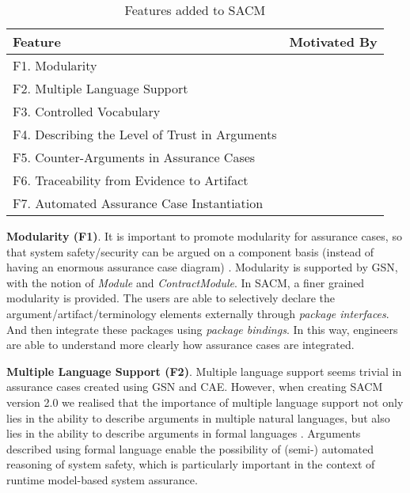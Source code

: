 \begin{table}
	\centering
	\vspace{-1em}
	\begin{tabular}{|l|l|}
		\hline
		\textbf{Feature}               & \multicolumn{1}{c|}{\textbf{Motivated By}}                        \\ \hline
		F1. Modularity            & \multicolumn{1}{c|}{\cite{despotou2008investigating}} \\ \hline
		F2. Multiple Language Support &\multicolumn{1}{c|}{\cite{denney2013formal}}                  \\ \hline
		F3. Controlled Vocabulary &\multicolumn{1}{c|}{\cite{luo2015safety, attwood2014use}}                  \\ \hline
		F4. Describing the Level of Trust in Arguments &\multicolumn{1}{c|}{\cite{hawkins2011new, fenn2005putting}}                  \\ \hline
		F5. Counter-Arguments in Assurance Cases &\multicolumn{1}{c|}{\cite{armstrong2004deconstruction}}                  \\ \hline
		F6. Traceability from Evidence to Artifact &\multicolumn{1}{c|}{\cite{taguchi2014linking}}                  \\ \hline
		F7. Automated Assurance Case Instantiation &\multicolumn{1}{c|}{\cite{hawkins2015need, hawkins2015weaving}}                  \\ \hline
	\end{tabular}
	\caption{Features added to SACM}
	\label{tab:feature}
	\vspace{-2em}
\end{table}

\textbf{Modularity (F1)}. It is important to promote modularity for assurance cases, so that system safety/security can be argued on a component basis (instead of having an enormous assurance case diagram) \cite{despotou2008investigating}. 
Modularity is supported by GSN, with the notion of \textit{Module} and \textit{ContractModule}.
In SACM, a finer grained modularity is provided. 
The users are able to selectively declare the argument/artifact/terminology elements externally through \textit{package interfaces}. 
And then integrate these packages using \textit{package bindings}.
In this way, engineers are able to understand more clearly how assurance cases are integrated.

\textbf{Multiple Language Support (F2)}. Multiple language support seems trivial in assurance cases created using GSN and CAE.
However, when creating SACM version 2.0 we realised that the importance of multiple language support not only lies in the ability to describe arguments in multiple natural languages, but also lies in the ability to describe arguments in formal languages \cite{denney2013formal}.
Arguments described using formal language enable the possibility of (semi-) automated reasoning of system safety, which is particularly important in the context of runtime model-based system assurance.

